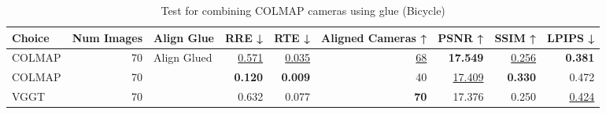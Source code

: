 \begin{table}[H]
\caption{Test for combining COLMAP cameras using glue (Bicycle)}
\label{tab:99_align_glue_bicycle}
\centering
\scriptsize
\begin{tabular}{lrlrrrrrr}
\toprule
Choice & Num Images & Align Glue & RRE ↓ & RTE ↓ & Aligned Cameras ↑ & PSNR ↑ & SSIM ↑ & LPIPS ↓ \\
\midrule
COLMAP & 70 & Align Glued & \underline{0.571} & \underline{0.035} & \underline{68} & \textbf{17.549} & \underline{0.256} & \textbf{0.381} \\
COLMAP & 70 &  & \textbf{0.120} & \textbf{0.009} & 40 & \underline{17.409} & \textbf{0.330} & 0.472 \\
VGGT & 70 &  & 0.632 & 0.077 & \textbf{70} & 17.376 & 0.250 & \underline{0.424} \\
\bottomrule
\end{tabular}
\end{table}